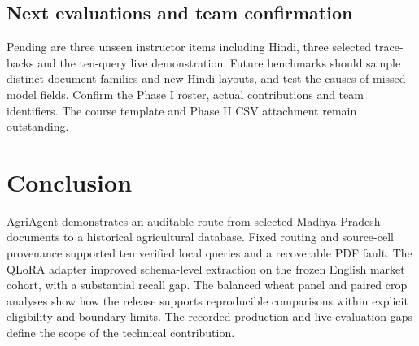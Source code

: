 \documentclass[11pt,a4paper]{article}
\begin{document}
\subsection{Next evaluations and team confirmation}
Pending are three unseen instructor items including Hindi, three selected trace-backs and the ten-query live demonstration. Future benchmarks should sample distinct document families and new Hindi layouts, and test the causes of missed model fields. Confirm the Phase I roster, actual contributions and team identifiers. The course template and Phase II CSV attachment remain outstanding.

\section{Conclusion}
AgriAgent demonstrates an auditable route from selected Madhya Pradesh documents to a historical agricultural database. Fixed routing and source-cell provenance supported ten verified local queries and a recoverable PDF fault. The QLoRA adapter improved schema-level extraction on the frozen English market cohort, with a substantial recall gap. The balanced wheat panel and paired crop analyses show how the release supports reproducible comparisons within explicit eligibility and boundary limits. The recorded production and live-evaluation gaps define the scope of the technical contribution.

\clearpage

\end{document}
